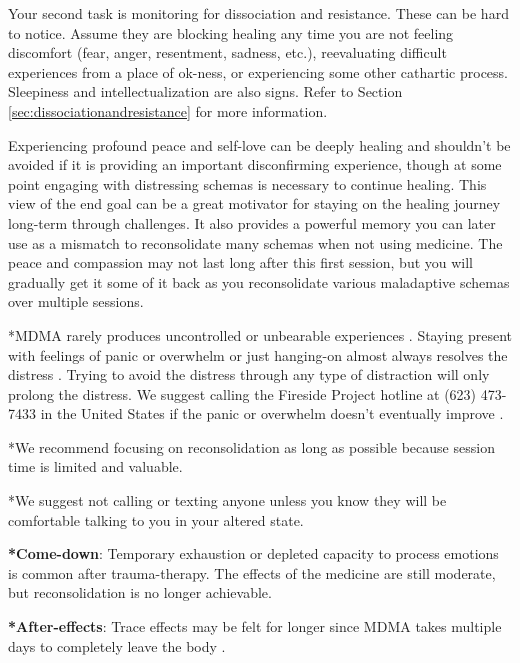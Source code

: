\documentclass[12pt,letterpaper]{article}
\begin{document}
Your second task is monitoring for dissociation and resistance. These can be hard to notice. Assume they are blocking healing any time you are not feeling discomfort (fear, anger, resentment, sadness, etc.), reevaluating difficult experiences from a place of ok-ness, or experiencing some other cathartic process. Sleepiness and intellectualization are also signs. Refer to Section \ref{sec:dissociationandresistance} for more information. 

Experiencing profound peace and self-love can be deeply healing and shouldn't be avoided if it is providing an important disconfirming experience, though at some point engaging with distressing schemas is necessary to continue healing. This view of the end goal can be a great motivator for staying on the healing journey long-term through challenges. It also provides a powerful memory you can later use as a mismatch to reconsolidate many schemas when not using medicine. The peace and compassion may not last long after this first session, but you will gradually get it some of it back as you reconsolidate various maladaptive schemas over multiple sessions. 

*MDMA rarely produces uncontrolled or unbearable experiences \cite{mitchellMDMAClinicalTrial2,mitchellMDMAClinicalTrial}. Staying present with feelings of panic or overwhelm or just hanging-on almost always resolves the distress \cite{mithoeferManual}. Trying to avoid the distress through any type of distraction will only prolong the distress. We suggest calling the Fireside Project hotline at (623) 473-7433 in the United States if the panic or overwhelm doesn't eventually improve \cite{firesideProject}. 

*We recommend focusing on reconsolidation as long as possible because session time is limited and valuable.

*We suggest not calling or texting anyone unless you know they will be comfortable talking to you in your altered state.

\textbf{*Come-down}: 
Temporary exhaustion or depleted capacity to process emotions is common after trauma-therapy. The effects of the medicine are still moderate, but reconsolidation is no longer achievable.

\textbf{*After-effects}:
Trace effects may be felt for longer since MDMA takes multiple days to completely leave the body \cite{torrePharmacology}.
\end{document}
